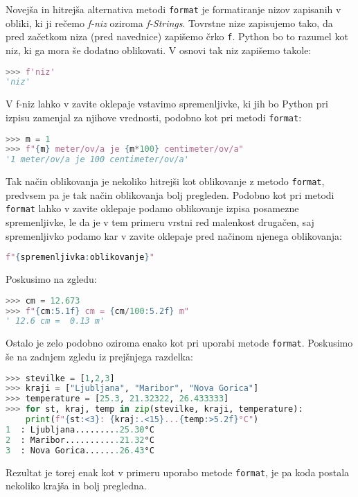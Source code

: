 Novejša in hitrejša alternativa metodi \texttt{format} je formatiranje nizov zapisanih v obliki, ki ji rečemo \emph{f-niz} oziroma \emph{f-Strings}. Tovrstne nize zapisujemo tako, da pred začetkom niza (pred navednice) zapišemo črko \texttt{f}. Python bo to razumel kot niz, ki ga mora še dodatno oblikovati. V osnovi tak niz zapišemo takole:
\begin{lstlisting}[language=Python]
>>> f'niz'
'niz'
\end{lstlisting}
V f-niz lahko v zavite oklepaje vstavimo spremenljivke, ki jih bo Python pri izpisu zamenjal za njihove vrednosti, podobno kot pri metodi \texttt{format}:
\begin{lstlisting}[language=Python]
>>> m = 1
>>> f"{m} meter/ov/a je {m*100} centimeter/ov/a"
'1 meter/ov/a je 100 centimeter/ov/a'
\end{lstlisting}
Tak način oblikovanja je nekoliko hitrejši kot oblikovanje z metodo \texttt{format}, predvsem pa je tak način oblikovanja bolj pregleden. Podobno kot pri metodi \texttt{format} lahko v zavite oklepaje podamo oblikovanje izpisa posamezne spremenljivke, le da je v tem primeru vrstni red malenkost drugačen, saj spremenljivko podamo kar v zavite oklepaje pred načinom njenega oblikovanja:
\begin{lstlisting}[language=Python]
f"{spremenljivka:oblikovanje}"
\end{lstlisting}
Poskusimo na zgledu:
\begin{lstlisting}[language=Python]
>>> cm = 12.673
>>> f"{cm:5.1f} cm = {cm/100:5.2f} m"
' 12.6 cm =  0.13 m'
\end{lstlisting}
Ostalo je zelo podobno oziroma enako kot pri uporabi metode \texttt{format}. Poskusimo še na zadnjem zgledu iz prejšnjega razdelka:
\begin{lstlisting}[language=Python]
>>> stevilke = [1,2,3]
>>> kraji = ["Ljubljana", "Maribor", "Nova Gorica"]
>>> temperature = [25.3, 21.32322, 26.433333]
>>> for st, kraj, temp in zip(stevilke, kraji, temperature):
	print(f"{st:<3}: {kraj:.<15}...{temp:>5.2f}°C")
1  : Ljubljana.........25.30°C
2  : Maribor...........21.32°C
3  : Nova Gorica.......26.43°C
\end{lstlisting}
Rezultat je torej enak kot v primeru uporabo metode \texttt{format}, je pa koda postala nekoliko krajša in bolj pregledna.